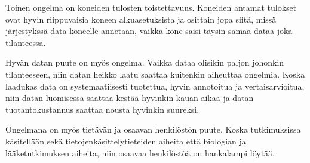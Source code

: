 \documentclass[finnish,twoside,censored,essay,sw-line]{HYthesisML}
\begin{document}
Toinen ongelma on koneiden tulosten toistettavuus. Koneiden antamat tulokset ovat hyvin riippuvaisia koneen
alkuasetuksista ja osittain jopa siitä, missä järjestykssä data koneelle annetaan, vaikka kone saisi täysin
samaa dataa joka tilanteessa.

Hyvän datan puute on myös ongelma. Vaikka dataa olisikin paljon johonkin tilanteeseen, niin datan heikko laatu
saattaa kuitenkin aiheuttaa ongelmia. Koska laadukas data on systemaatiisesti tuotettua, hyvin annotoitua ja
vertaisarvioitua, niin datan luomisessa saattaa kestää hyvinkin kauan aikaa ja datan tuotantokustannus saattaa
nousta hyvinkin suureksi.

Ongelmana on myös tietävän ja osaavan henkilöstön puute. Koska tutkimuksissa käsitellään sekä tietojenkäsittelytieteiden
aiheita että biologian ja lääketutkimuksen aiheita, niin osaavaa henkilöstöä on hankalampi löytää.

\cleardoublepage
{}
{}
\printbibliography

\backmatter
\end{document}

